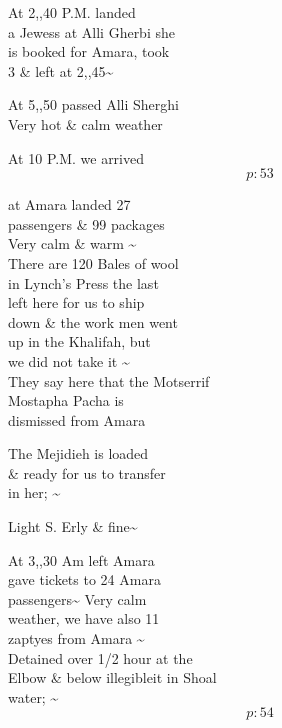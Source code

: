\documentclass{report}
\begin{document}
	\par{
 	At 2,,40 P.M. landed\ \\a Jewess at Alli Gherbi she\ \\is booked for Amara, took\ \\3 \& left at 2,,45\~{}\ \\
	}

	\par{
 	At 5,,50 passed Alli Sherghi\ \\Very hot \& calm weather\ \\
	}

	\par{
 	At 10 P.M. we arrived\ \\
  \[p: 53 \]

	}






	\par{
 	at Amara landed 27\ \\passengers \& 99 packages\ \\Very calm \& warm \~{}\ \\There are 120 Bales of wool\ \\in Lynch’s Press the last\ \\left here for us to ship\ \\down \& the work men went\ \\up in the Khalifah, but\ \\we did not take it \~{}\ \\They say here that the Motserrif\ \\Mostapha Pacha is\ \\dismissed from Amara\ \\
	}

	\par{
 	The Mejidieh is loaded\ \\\& ready for us to transfer\ \\in her; \~{}\ \\
	}

	\par{
 	Light S. Erly \& fine\~{}\ \\
	}

	\par{
 	At 3,,30 Am left Amara\ \\gave tickets to 24 Amara\ \\passengers\~{} Very calm\ \\weather, we have also 11\ \\zaptyes from Amara \~{}\ \\Detained over 1/2 hour at the\ \\Elbow \& below \lbrack illegible\rbrack it in Shoal\ \\water; \~{}\ \\
  \[p: 54 \]

	}
\end{document}
